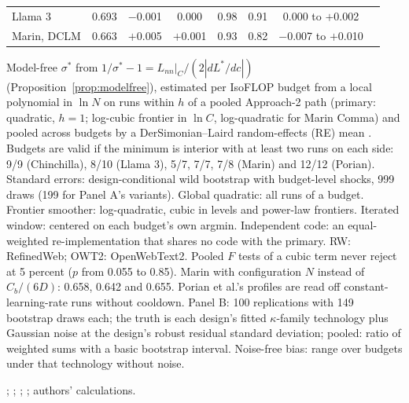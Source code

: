 \begin{table}[tp]
\begin{tabular*}{\textwidth}{@{\extracolsep{\fill}}lccccccccc@{}}
Llama 3 & 0.693 & $-$0.001 & 0.000 & 0.98 & 0.91 & \multicolumn{3}{c}{0.000 to $+$0.002} & \\
Marin, DCLM & 0.663 & $+$0.005 & $+$0.001 & 0.93 & 0.82 & \multicolumn{3}{c}{$-$0.007 to $+$0.010} & \\
\bottomrule
\end{tabular*}
\par\smallskip
\begin{tablenotes}
Model-free $\sigma^*$ from $1/\sigma^*-1=L_{nn}|_C/(2|dL^*/dc|)$ (Proposition~\ref{prop:modelfree}), estimated per
IsoFLOP budget from a local polynomial in $\ln N$ on runs within $h$ of a pooled Approach-2 path (primary: quadratic,
$h=1$; log-cubic frontier in $\ln C$, log-quadratic for Marin Comma) and pooled across budgets by a DerSimonian--Laird
random-effects (RE) mean \citep{dersimonian1986meta}. Budgets are valid if the minimum is interior with at least two runs on
each side: 9/9 (Chinchilla), 8/10 (Llama 3), 5/7, 7/7, 7/8 (Marin) and 12/12 (Porian). Standard errors: design-conditional
wild bootstrap with budget-level shocks, 999 draws (199 for Panel A's variants). Global quadratic: all runs of a budget.
Frontier smoother: log-quadratic, cubic in levels and power-law frontiers. Iterated window: centered on each budget's own
argmin. Independent code: an equal-weighted re-implementation that shares no code with the primary. RW:
RefinedWeb; OWT2: OpenWebText2. Pooled $F$ tests of a cubic term never reject at 5
percent ($p$ from 0.055 to 0.85). Marin with configuration $N$ instead of $C_b/(6D)$: 0.658, 0.642 and 0.655. Porian et
al.'s profiles are read off constant-learning-rate runs without cooldown. Panel B: 100 replications with 149 bootstrap draws each; the truth is each design's fitted
$\kappa$-family technology plus Gaussian noise at the design's robust residual standard deviation; pooled: ratio of
weighted sums with a basic bootstrap interval. Noise-free bias: range over budgets under that technology without noise.
\end{tablenotes}
\begin{tablenotes}[Source]
\citet{hoffmann2022training}; \citet{czech2026llama3isoflop}; \citet{marin2026ladders}; \citet{porian2024resolving};
authors' calculations.
\end{tablenotes}
\end{table}
